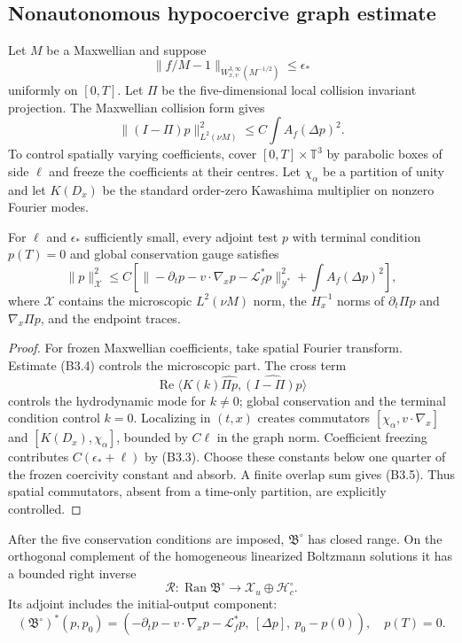 \subsection{Nonautonomous hypocoercive graph estimate}

Let $M$ be a Maxwellian and suppose
\[
 \|f/M-1\|_{W^{3,\infty}_{x,v}(M^{-1/2})}\le\epsilon_*    \tag{B3.3}
\]
uniformly on $[0,T]$.  Let $\Pi$ be the five-dimensional local collision
invariant projection.  The Maxwellian collision form gives
\[
 \|(I-\Pi)p\|_{L^2(\nu M)}^2
 \le C\int A_f(\Delta p)^2.                               \tag{B3.4}
\]
To control spatially varying coefficients, cover
$[0,T]\times\mathbb T^3$ by parabolic boxes of side $\ell$ and freeze the
coefficients at their centres.  Let $\chi_\alpha$ be a partition of unity and
let $K(D_x)$ be the standard order-zero Kawashima multiplier on nonzero
Fourier modes.

\begin{lemma}
\label{lem:r27-b3-observe}
For $\ell$ and $\epsilon_*$ sufficiently small, every adjoint test $p$ with
terminal condition $p(T)=0$ and global conservation gauge satisfies
\[
 \|p\|_{\mathcal X}^2
 \le C\left[
 \|-\partial_tp-v\cdot\nabla_xp-\mathcal L_f^*p\|_{\mathcal Y^*}^2
 +\int A_f(\Delta p)^2\right],                            \tag{B3.5}
\]
where $\mathcal X$ contains the microscopic
$L^2(\nu M)$ norm, the $H^{-1}_x$ norms of
$\partial_t\Pi p$ and $\nabla_x\Pi p$, and the endpoint traces.
\end{lemma}

\begin{proof}
For frozen Maxwellian coefficients, take spatial Fourier transform.  Estimate
(B3.4) controls the microscopic part.  The cross term
\[
 \operatorname{Re}\langle K(k)\widehat{\Pi p},
                         \widehat{(I-\Pi)p}\rangle
\]
controls the hydrodynamic mode for $k\ne0$; global conservation and the
terminal condition control $k=0$.  Localizing in $(t,x)$ creates commutators
$[\chi_\alpha,v\cdot\nabla_x]$ and
$[K(D_x),\chi_\alpha]$, bounded by $C\ell$ in the graph norm.  Coefficient
freezing contributes $C(\epsilon_*+\ell)$ by (B3.3).  Choose these constants
below one quarter of the frozen coercivity constant and absorb.  A finite
overlap sum gives (B3.5).  Thus spatial commutators, absent from a
time-only partition, are explicitly controlled.
\end{proof}

\begin{theorem}
\label{thm:r27-b3-range}
After the five conservation conditions are imposed,
$\mathfrak B^\circ$ has closed range.  On the orthogonal complement of the
homogeneous linearized Boltzmann solutions it has a bounded right inverse
\[
 \mathcal R:\operatorname{Ran}\mathfrak B^\circ
 \longrightarrow\mathcal X_u\oplus\mathcal H_c^\circ.     \tag{B3.6}
\]
Its adjoint includes the initial-output component:
\[
 (\mathfrak B^\circ)^*(p,p_0)
 =\left(-\partial_tp-v\cdot\nabla_xp-\mathcal L_f^*p,\
        [\Delta p],\ p_0-p(0)\right),\quad p(T)=0.         \tag{B3.7}
\]
\end{theorem}

